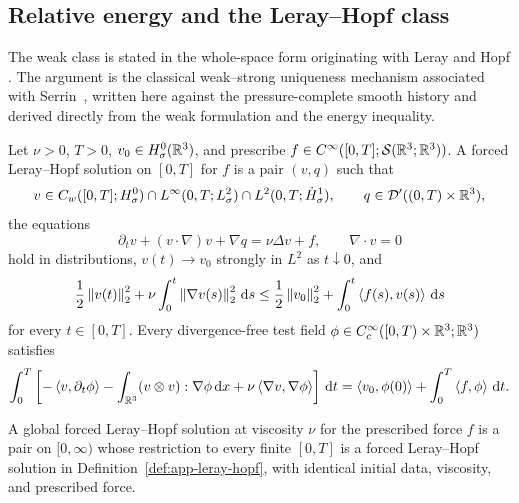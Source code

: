 \subsection{Relative energy and the Leray–Hopf class}

The weak class is stated in the whole-space form originating with Leray and
Hopf \cite{Leray1934,Hopf1951}.  The argument is the classical weak--strong
uniqueness mechanism associated with Serrin~\cite{Serrin1962}, written here
against the pressure-complete smooth history and derived directly from the
weak formulation and the energy inequality.

\begin{definition}
\label{def:app-leray-hopf}
Let \(\nu>0\), \(T>0\), \(v_0\in H^0_\sigma(\mathbb R^3)\), and prescribe
\(f\in C^\infty([0,T];\mathcal S(\mathbb R^3;\mathbb R^3))\).  A forced
Leray--Hopf solution on \([0,T]\) for \(f\) is a pair \((v,q)\) such that
\[
 v\in C_w([0,T];H^0_\sigma)
 \cap L^\infty(0,T;L^2_\sigma)
 \cap L^2(0,T;\dot H^1_\sigma),
 \qquad
 q\in\mathcal D'((0,T)\times\mathbb R^3),
\]
the equations
\[
 \partial_tv+(v\cdot\nabla)v+\nabla q=\nu\Delta v+f,
 \qquad
 \nabla\cdot v=0
\]
hold in distributions, \(v(t)\to v_0\) strongly in \(L^2\) as
\(t\downarrow0\), and
\begin{equation}
 \frac12\left\lVert v(t)\right\rVert_2^2
 +\nu\int_0^t\left\lVert \nabla v(s)\right\rVert_2^2\,\mathrm d s
 \le\frac12\left\lVert v_0\right\rVert_2^2
 +\int_0^t\left\langle f(s),v(s)\right\rangle\,\mathrm d s
 \label{eq:app-leray-energy}
\end{equation}
for every \(t\in[0,T]\).  Every divergence-free test field
\(\phi\in C_c^\infty([0,T)\times\mathbb R^3;\mathbb R^3)\) satisfies
\begin{equation}
 \int_0^T\left[
 -\left\langle v,\partial_t\phi\right\rangle
 -\int_{\mathbb R^3}(v\otimes v):\nabla\phi\,\mathrm d x
 +\nu\left\langle \nabla v,\nabla\phi\right\rangle
 \right]\,\mathrm d t
 =\left\langle v_0,\phi(0)\right\rangle
 +\int_0^T\left\langle f,\phi\right\rangle\,\mathrm d t.
 \label{eq:app-leray-weak-form}
\end{equation}
\end{definition}

A global forced Leray--Hopf solution at viscosity \(\nu\) for the
prescribed force \(f\) is a pair on
\([0,\infty)\) whose restriction to every finite \([0,T]\) is a
forced Leray--Hopf solution in Definition~\ref{def:app-leray-hopf}, with
identical initial data, viscosity, and prescribed force.

